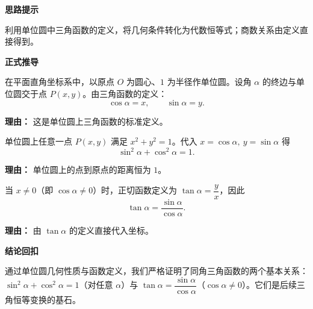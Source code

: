\begin{proofbox}
	\textbf{\textcolor{CProof}{思路提示}}

	利用单位圆中三角函数的定义，将几何条件转化为代数恒等式；商数关系由定义直接得到。

	\medskip
	\textbf{\textcolor{CProof}{正式推导}}
	\begin{description}[style=nextline, leftmargin=2.8em, labelsep=0.5em, itemsep=0.55em]
		\item[\textbf{步骤一（定义坐标）：}]
			在平面直角坐标系中，以原点 $O$ 为圆心、$1$ 为半径作单位圆。设角 $\alpha$ 的终边与单位圆交于点 $P(x,y)$。由三角函数的定义：
			\[
				\cos\alpha = x,
				\qquad
				\sin\alpha = y.
			\]
			\par\textbf{理由：} 这是单位圆上三角函数的标准定义。

		\item[\textbf{步骤二（圆方程代换）：}]
			单位圆上任意一点 $P(x,y)$ 满足 $x^2+y^2=1$。代入 $x=\cos\alpha,\ y=\sin\alpha$ 得
			\[
				\sin^2\alpha + \cos^2\alpha = 1.
			\]
			\par\textbf{理由：} 单位圆上的点到原点的距离恒为 $1$。

		\item[\textbf{步骤三（商数关系）：}]
			当 $x\neq0$（即 $\cos\alpha\neq0$）时，正切函数定义为 $\tan\alpha=\dfrac{y}{x}$，因此
			\[
				\tan\alpha = \frac{\sin\alpha}{\cos\alpha}.
			\]
			\par\textbf{理由：} 由 $\tan\alpha$ 的定义直接代入坐标。
	\end{description}

	\medskip
	\textbf{\textcolor{CProof}{结论回扣}}

	通过单位圆几何性质与函数定义，我们严格证明了同角三角函数的两个基本关系：$\sin^2\alpha+\cos^2\alpha=1$（对任意 $\alpha$）与 $\tan\alpha=\dfrac{\sin\alpha}{\cos\alpha}$（$\cos\alpha\neq0$）。它们是后续三角恒等变换的基石。
\end{proofbox}
